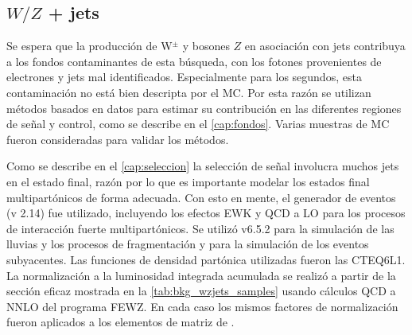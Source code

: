 \begin{table}[!htbp]
\begin{tabularx}{\textwidth}{LCRRRR}
  \end{tabularx}
  \label{tab:bkg_wzgamma_samples}
\end{table}


\subsection{$W/Z$ + jets}
\label{mc_wzjets}

Se espera que la producción de W$^{\pm}$ y bosones $Z$ en asociación con jets
contribuya a los fondos contaminantes de esta búsqueda, con los fotones provenientes de electrones y jets
mal identificados. Especialmente para los segundos, esta contaminación no está
bien descripta por el MC. Por esta razón se utilizan métodos basados en datos
para estimar su contribución en las diferentes regiones de señal y control, como
se describe en el \cref{cap:fondos}. Varias muestras de MC
fueron consideradas para validar los métodos.

Como se describe en el \cref{cap:seleccion} la selección de señal involucra
muchos jets en el estado final, razón por lo que es importante modelar los estados final
multipartónicos de forma adecuada. Con esto en mente, el generador de eventos
{\alpgen} (v 2.14) fue utilizado, incluyendo los efectos EWK y QCD a LO para los
procesos de interacción fuerte multipartónicos. Se utilizó {\herwig} v6.5.2 para la simulación de las lluvias y los procesos de
fragmentación y {\jimmy} para la simulación de los eventos subyacentes. Las
funciones de densidad partónica utilizadas fueron las CTEQ6L1. La normalización
a la luminosidad integrada acumulada se realizó a partir de la sección eficaz
mostrada en la \cref{tab:bkg_wzjets_samples} usando cálculos QCD a NNLO del
programa FEWZ\cite{Anastasiou:2003ds}. En cada caso los mismos factores de
normalización fueron aplicados a los elementos de matriz de {\alpgen}.

